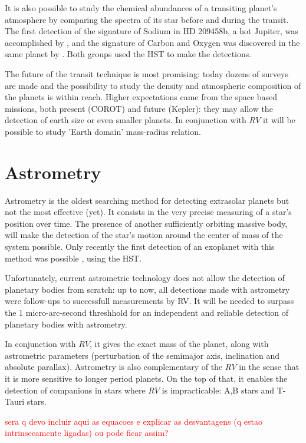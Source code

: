 \documentclass[dvips,12pt,a4paper]{report}
\begin{document}
It is also possible to study the chemical abundances of a transiting planet's atmosphere by comparing the spectra of its star before and during the transit. The first detection of the signature of Sodium in HD 209458b, a hot Jupiter, was accomplished by \citet{Charbonneau-2002}, and the signature of Carbon and Oxygen was discovered in the same planet by \citet{Vidal-Madjar-2004}. Both groups used the HST to make the detections.

The future of the transit technique is most promising: today dozens of surveys are made and the possibility to study the density and atmospheric composition of the planets is within reach. Higher expectations came from the space based missions, both present (COROT) and future (Kepler): they may allow the detection of earth size or even smaller planets. In conjunction with $RV$ it will be possible to study 'Earth domain' mass-radius relation.

\section{Astrometry}
\label{astrometry}
Astrometry is the oldest searching method for detecting extrasolar planets but not the most effective (yet). It consists in the very precise measuring of a star's position over time. The presence of another sufficiently orbiting massive body, will make the detection of the star's motion around the center of mass of the system possible. Only recently the first detection of an exoplanet with this method was possible \citep{Benedict-2002}, using the HST. 

Unfortunately, current astrometric technology does not allow the detection of planetary bodies from scratch: up to now, all detections made with astrometry were follow-ups to successfull measurements by RV. It will be needed to surpass the 1 micro-arc-second threshhold for an independent and reliable detection of planetary bodies with astrometry.

In conjunction with $RV$, it gives the exact mass of the planet, along with astrometric parameters (perturbation of the semimajor axis, inclination and absolute parallax). Astrometry is also complementary of the $RV$ in the sense that it is more sensitive to longer period planets. On the top of that, it enables the detection of companions in stars where $RV$ is impracticable: A,B stars and T-Tauri stars.

\textcolor{red}{sera q devo incluir aqui as equacoes e explicar as desvantagens (q estao intrinsecamente ligadas) ou pode ficar assim?}
\end{document}
